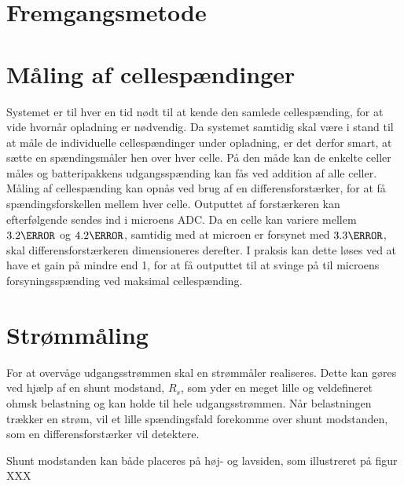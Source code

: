 \section{Fremgangsmetode}

\section{Måling af cellespændinger}
Systemet er til hver en tid nødt til at kende den samlede cellespænding, for at vide hvornår opladning er nødvendig. Da systemet samtidig skal være i stand til at måle de individuelle cellespændinger under opladning, er det derfor smart, at sætte en spændingsmåler hen over hver celle. På den måde kan de enkelte celler måles og batteripakkens udgangsspænding kan fås ved addition af alle celler.
\\

Måling af cellespænding kan opnås ved brug af en differensforstærker, for at få spændingsforskellen mellem hver celle. Outputtet af forstærkeren kan efterfølgende sendes ind i microens ADC. Da en celle kan variere mellem $3.2\volt$ og $4.2\volt$, samtidig med at microen er forsynet med $3.3\volt$, skal differensforstærkeren dimensioneres derefter. I praksis kan dette løses ved at have et gain på mindre end 1, for at få outputtet til at svinge på til microens forsyningsspænding ved maksimal cellespænding.
\\



\section{Strømmåling}
For at overvåge udgangsstrømmen skal en strømmåler realiseres. Dette kan gøres ved hjælp af en shunt modstand, $R_{s}$, som yder en meget lille og veldefineret ohmsk belastning og kan holde til hele udgangsstrømmen. Når belastningen trækker en strøm, vil et lille spændingsfald forekomme over shunt modstanden, som en differensforstærker vil detektere. 


Shunt modstanden kan både placeres på høj- og lavsiden, som illustreret på figur XXX



